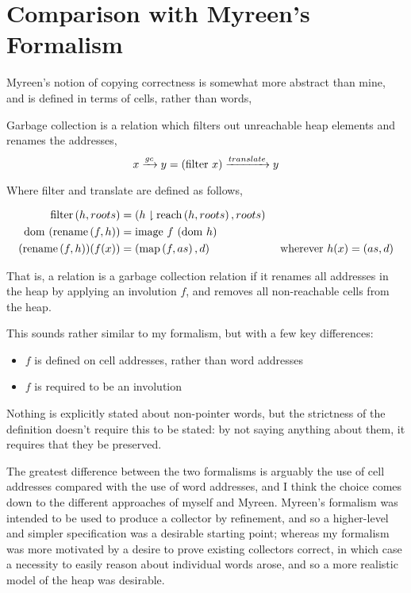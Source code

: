 \section{Comparison with Myreen's Formalism}
\label{sec:copying-myreen}

Myreen's\cite{Myreen10} notion of copying correctness is somewhat more
abstract than mine, and is defined in terms of cells, rather than
words,

\begin{definition}
  \label{def:c-myreen-correctness}
  Garbage collection is a relation which filters out unreachable heap
  elements and renames the addresses, \[x \gc y = (\mathrm{filter}~x)
  \translate y\]

  Where filter and translate are defined as follows,

  \begin{prooftree}
  \end{prooftree}

  \begin{align*}
    \filter{h}{roots} &= (h \restrict \reach{h}{roots}, roots)\\
    \dom~(\rename{f}{h}) &= \mathrm{image}~f~(\dom~h)\\
    (\rename{f}{h})(f(x)) &= (\map{f}{as}, d) & \mbox{ wherever } h(x)
    = (as, d)\\
  \end{align*}
\end{definition}

That is, a relation is a garbage collection relation if it renames all
addresses in the heap by applying an involution $f$, and removes all
non-reachable cells from the heap.

This sounds rather similar to my formalism, but with a few key
differences:

\begin{itemize}
\item $f$ is defined on cell addresses, rather than word addresses
\item $f$ is required to be an involution
\end{itemize}

Nothing is explicitly stated about non-pointer words, but the
strictness of the definition doesn't require this to be stated: by not
saying anything about them, it requires that they be preserved.

The greatest difference between the two formalisms is arguably the use
of cell addresses compared with the use of word addresses, and I think
the choice comes down to the different approaches of myself and
Myreen. Myreen's formalism was intended to be used to produce a
collector by refinement, and so a higher-level and simpler
specification was a desirable starting point; whereas my formalism was
more motivated by a desire to prove existing collectors correct, in
which case a necessity to easily reason about individual words arose,
and so a more realistic model of the heap was desirable.

